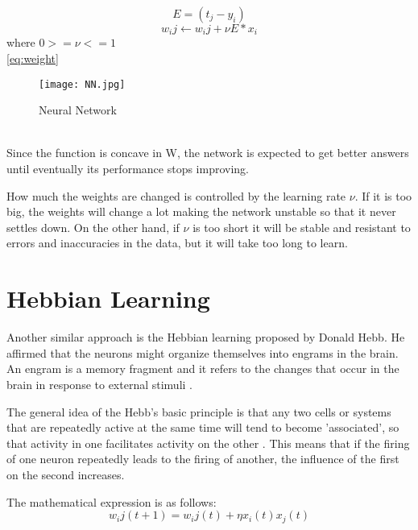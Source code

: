 \begin{equation}
\label{eq:error}
E=(t_j - y_i)
\end{equation}
\begin{equation}
\label{eq:weight}
w_ij \leftarrow w_ij+\nu E * x_i
\end{equation} where $0>=\nu<=1$ \\
\ref{eq:weight}
\begin{figure}
\label{fig:nn}
\center
\texttt{[image: NN.jpg]}
\caption{Neural Network}
\end{figure}
\\
Since the function is concave in W, the network is expected to get better answers until eventually its performance stops improving.

How much the weights are changed is controlled by the learning rate $\nu$. If it is too big, the weights will change a lot  making the network unstable so that it never settles down. On the other hand, if $\nu$ is too short it will be stable and resistant to errors and inaccuracies in the data, but it will take too long to learn. 


\section{Hebbian Learning}
Another similar approach is the Hebbian learning proposed by Donald Hebb. He affirmed that the neurons might organize themselves into engrams in the brain. An engram is a memory fragment and it refers to the changes that occur in the brain in response to external stimuli \cite{strom2007hebbian}.

The general idea of the Hebb's basic principle is that any two cells or systems that are repeatedly active at the same time will tend to become 'associated', so that activity in one facilitates activity on the other \cite{morris1999hebb}. This means that if the firing of one neuron repeatedly leads to the firing of another, the influence of the first on the second increases.

The mathematical expression is as follows:
\begin{equation}
\label{eq:hebbianrule}
w_ij (t+1)= w_ij(t)+\eta x_i(t)x_j(t)
\end{equation}

